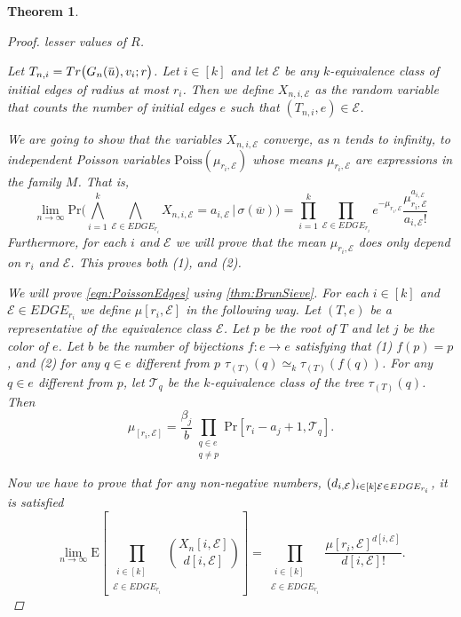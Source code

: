 \documentclass[12pt,notitlepage,a4paper]{article}
\newtheorem{theorem}{Theorem}[section]
\theoremstyle{definition}
\newcommand{\N}{\mathbb{N}}
\newcommand{\Ln}{\lim\limits_{n\to \infty}}
\newcommand{\overbar}[1]{\mkern 1.5mu\overline{\mkern-1.5mu#1\mkern-1.5mu}\mkern 1.5mu}
\begin{document}
\begin{theorem}
\begin{proof}
		lesser values of $R$.  \par
		Let $T_{n,i}=Tr\big(G_n(\overbar{u}),v_i;r\big)$. 
		Let $i\in [k]$ and let $\mathcal{E}$ be any $k$-equivalence class
		of initial edges of radius at most $r_i$. Then we define $X_{n,i,\mathcal{E}}$
		as the random variable that counts the number of initial edges $e$ such that
		$(T_{n,i},e)\in \mathcal{E}$.\par
		We are going to show that the variables $X_{n,i,\mathcal{E}}$ converge, as
		$n$ tends to infinity, to independent Poisson variables 
		$\mathrm{Poiss}(\mu_{r_i,\mathcal{E}})$ whose means $\mu_{r_i,\mathcal{E}}$ 
		are expressions in the family $M$. That is,
		\begin{equation} \label{eqn:PoissonEdges}
		\Ln \mathrm{Pr}\big(
		\bigwedge_{i=1}^k \bigwedge_{\mathcal{E} \in EDGE_{r_i}} X_{n,i,\mathcal{E}}=a_{i,\mathcal{E}}
		\, | \, \sigma(\overline{w})\big) =
		\prod_{i=1}^k \prod_{\mathcal{E} \in EDGE_{r_i}} e^{-\mu_{r_i,\mathcal{E}}}
		\frac{\mu_{r_i,\mathcal{E}}^{a_{i,\mathcal{E}}}}{a_{i,\mathcal{E}}!}
		\end{equation}
		Furthermore, for each $i$ and $\mathcal{E}$ we will prove that the mean 
		$\mu_{r_i,\mathcal{E}}$ does only depend on $r_i$ and $\mathcal{E}$.
		This proves both (1), and (2).\par
		
		We will prove \cref{eqn:PoissonEdges} using \cref{thm:BrunSieve}.
		For each $i\in [k]$ and $\mathcal{E}\in EDGE_{r_i}$ we define $\mu[r_i,\mathcal{E}]$
		in the following way. Let $(T,e)$ be a representative of the equivalence class
		$\mathcal{E}$. Let $p$ be the root of $T$ and let $j$ be the color of $e$. 
		Let $b$ be the number of bijections $f:e\rightarrow e$ satisfying that (1)
		$f(p)=p$, and (2) for any $q\in e$ different from $p$
		$\tau_{(T)}(q) \simeq_k \tau_{(T)}(f(q))$. For any $q\in e$ 
		different from $p$, let $\mathcal{T}_q$ be the $k$-equivalence class
		of the tree $\tau_{(T)}(q)$. Then
		\[
		\mu_[r_i,\mathcal{E}]=\frac{\beta_j}{b} \prod_{\substack{q\in e \\ q\neq p}} 
		\mathrm{Pr}[r_i-a_j+1,\mathcal{T}_q].
		\]
		
		Now we have to prove that for any non-negative numbers, 
		$(d_{i,\mathcal{E}})_{\substack{i\in [k]}\\
		\mathcal{E}\in EDGE_{r_i}}$, it is satisfied
		\[\Ln
		\mathrm{E}\left[
		\prod_{\substack{\substack{i\in [k]}\\
				\mathcal{E}\in EDGE_{r_i}}} \binom{X_n[i,\mathcal{E}]}{d[i,\mathcal{E}]}
		\right] = \prod_{\substack{\substack{i\in [k]}\\
				\mathcal{E}\in EDGE_{r_i}}} \frac{\mu[r_i,\mathcal{E}]^{d[i,\mathcal{E}]}}
			{d[i,\mathcal{E}]!}.\]
	\end{proof}
	
\end{theorem}
\end{document}
